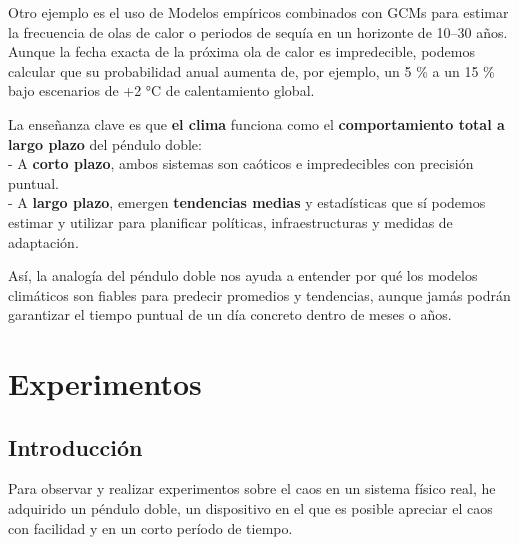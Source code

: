\documentclass[
  10pt,
  a4paper,
  DIV=11,
  numbers=noendperiod,
  open=any]{scrreprt}
\numberwithin{equation}{chapter}
\numberwithin{equation}{section}
\renewcommand{\[}{\begin{equation}}
\renewcommand{\]}{\end{equation}}
\begin{document}
Otro ejemplo es el uso de Modelos empíricos combinados con GCMs para
estimar la frecuencia de olas de calor o periodos de sequía en un
horizonte de 10--30 años. Aunque la fecha exacta de la próxima ola de
calor es impredecible, podemos calcular que su probabilidad anual
aumenta de, por ejemplo, un 5 \% a un 15 \% bajo escenarios de +2 °C de
calentamiento global.

La enseñanza clave es que \textbf{el clima} funciona como el
\textbf{comportamiento total a largo plazo} del péndulo doble:\\
- A \textbf{corto plazo}, ambos sistemas son caóticos e impredecibles
con precisión puntual.\\
- A \textbf{largo plazo}, emergen \textbf{tendencias medias} y
estadísticas que sí podemos estimar y utilizar para planificar
políticas, infraestructuras y medidas de adaptación.

Así, la analogía del péndulo doble nos ayuda a entender por qué los
modelos climáticos son fiables para predecir promedios y tendencias,
aunque jamás podrán garantizar el tiempo puntual de un día concreto
dentro de meses o años.

\chapter{Experimentos}\label{experimentos}

\section{Introducción}\label{introducciuxf3n-4}

Para observar y realizar experimentos sobre el caos en un sistema físico
real, he adquirido un péndulo doble, un dispositivo en el que es posible
apreciar el caos con facilidad y en un corto período de tiempo.
\end{document}
